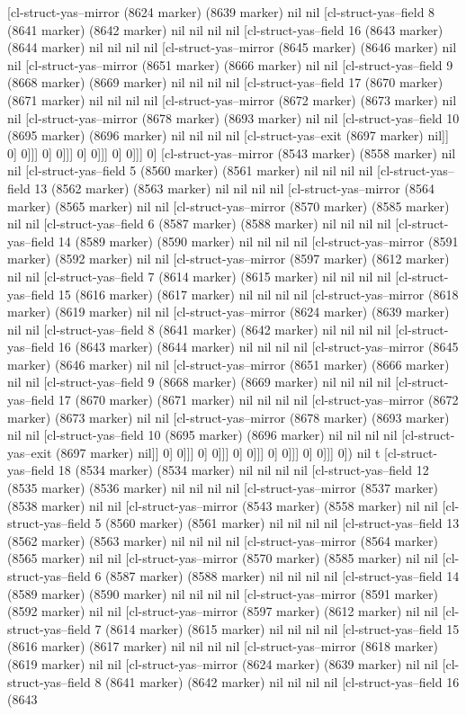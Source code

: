 {{[cl-struct-yas--mirror (8624 marker) (8639 marker) nil nil [cl-struct-yas--field 8 (8641 marker) (8642 marker) nil nil nil nil [cl-struct-yas--field 16 (8643 marker) (8644 marker) nil nil nil nil [cl-struct-yas--mirror (8645 marker) (8646 marker) nil nil [cl-struct-yas--mirror (8651 marker) (8666 marker) nil nil [cl-struct-yas--field 9 (8668 marker) (8669 marker) nil nil nil nil [cl-struct-yas--field 17 (8670 marker) (8671 marker) nil nil nil nil [cl-struct-yas--mirror (8672 marker) (8673 marker) nil nil [cl-struct-yas--mirror (8678 marker) (8693 marker) nil nil [cl-struct-yas--field 10 (8695 marker) (8696 marker) nil nil nil nil [cl-struct-yas--exit (8697 marker) nil]] 0] 0]]] 0] 0]]] 0] 0]]] 0] 0]]] 0] [cl-struct-yas--mirror (8543 marker) (8558 marker) nil nil [cl-struct-yas--field 5 (8560 marker) (8561 marker) nil nil nil nil [cl-struct-yas--field 13 (8562 marker) (8563 marker) nil nil nil nil [cl-struct-yas--mirror (8564 marker) (8565 marker) nil nil [cl-struct-yas--mirror (8570 marker) (8585 marker) nil nil [cl-struct-yas--field 6 (8587 marker) (8588 marker) nil nil nil nil [cl-struct-yas--field 14 (8589 marker) (8590 marker) nil nil nil nil [cl-struct-yas--mirror (8591 marker) (8592 marker) nil nil [cl-struct-yas--mirror (8597 marker) (8612 marker) nil nil [cl-struct-yas--field 7 (8614 marker) (8615 marker) nil nil nil nil [cl-struct-yas--field 15 (8616 marker) (8617 marker) nil nil nil nil [cl-struct-yas--mirror (8618 marker) (8619 marker) nil nil [cl-struct-yas--mirror (8624 marker) (8639 marker) nil nil [cl-struct-yas--field 8 (8641 marker) (8642 marker) nil nil nil nil [cl-struct-yas--field 16 (8643 marker) (8644 marker) nil nil nil nil [cl-struct-yas--mirror (8645 marker) (8646 marker) nil nil [cl-struct-yas--mirror (8651 marker) (8666 marker) nil nil [cl-struct-yas--field 9 (8668 marker) (8669 marker) nil nil nil nil [cl-struct-yas--field 17 (8670 marker) (8671 marker) nil nil nil nil [cl-struct-yas--mirror (8672 marker) (8673 marker) nil nil [cl-struct-yas--mirror (8678 marker) (8693 marker) nil nil [cl-struct-yas--field 10 (8695 marker) (8696 marker) nil nil nil nil [cl-struct-yas--exit (8697 marker) nil]] 0] 0]]] 0] 0]]] 0] 0]]] 0] 0]]] 0] 0]]] 0]) nil t [cl-struct-yas--field 18 (8534 marker) (8534 marker) nil nil nil nil [cl-struct-yas--field 12 (8535 marker) (8536 marker) nil nil nil nil [cl-struct-yas--mirror (8537 marker) (8538 marker) nil nil [cl-struct-yas--mirror (8543 marker) (8558 marker) nil nil [cl-struct-yas--field 5 (8560 marker) (8561 marker) nil nil nil nil [cl-struct-yas--field 13 (8562 marker) (8563 marker) nil nil nil nil [cl-struct-yas--mirror (8564 marker) (8565 marker) nil nil [cl-struct-yas--mirror (8570 marker) (8585 marker) nil nil [cl-struct-yas--field 6 (8587 marker) (8588 marker) nil nil nil nil [cl-struct-yas--field 14 (8589 marker) (8590 marker) nil nil nil nil [cl-struct-yas--mirror (8591 marker) (8592 marker) nil nil [cl-struct-yas--mirror (8597 marker) (8612 marker) nil nil [cl-struct-yas--field 7 (8614 marker) (8615 marker) nil nil nil nil [cl-struct-yas--field 15 (8616 marker) (8617 marker) nil nil nil nil [cl-struct-yas--mirror (8618 marker) (8619 marker) nil nil [cl-struct-yas--mirror (8624 marker) (8639 marker) nil nil [cl-struct-yas--field 8 (8641 marker) (8642 marker) nil nil nil nil [cl-struct-yas--field 16 (8643 }}
